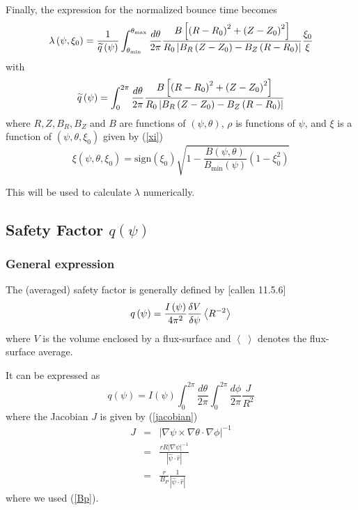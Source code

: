 \documentclass{article}
\begin{document}
Finally, the expression for the normalized bounce time becomes 
\begin{equation}
\lambda \left( \psi ,\xi _{0}\right) =\frac{1}{\widetilde{q}\left( \psi
\right) }\int_{\theta _{\min }}^{\theta _{\max }}\frac{d\theta }{2\pi }\frac{%
B\left[ \left( R-R_{0}\right) ^{2}+\left( Z-Z_{0}\right) ^{2}\right] }{%
R_{0}\left| B_{R}\left( Z-Z_{0}\right) -B_{Z}\left( R-R_{0}\right) \right| }%
\frac{\xi _{0}}{\xi }  \label{lambda1}
\end{equation}
with
\begin{equation}
\widetilde{q}\left( \psi \right) =\int_{0}^{2\pi }\frac{d\theta }{2\pi }%
\frac{B\left[ \left( R-R_{0}\right) ^{2}+\left( Z-Z_{0}\right) ^{2}\right] }{%
R_{0}\left| B_{R}\left( Z-Z_{0}\right) -B_{Z}\left( R-R_{0}\right) \right| }
\end{equation}
where $R,Z,B_{R},B_{Z}$ and $B$ are functions of $\left( \psi ,\theta
\right) $, $\rho $ is functions of $\psi $, and $\xi $ is a function of $%
\left( \psi ,\theta ,\xi _{0}\right) $ given by (\ref{xi}) 
\[
\xi \left( \psi ,\theta ,\xi _{0}\right) =\text{sign}\left( \xi _{0}\right) 
\sqrt{1-\frac{B\left( \psi ,\theta \right) }{B_{\min }\left( \psi \right) }%
\left( 1-\xi _{0}^{2}\right) }
\]

This will be used to calculate $\lambda $ numerically.

\subsection{Safety Factor $q\left( \psi \right) $}

\subsubsection{General expression}

The (averaged) safety factor is generally defined by [callen 11.5.6]
\begin{equation}
q\left( \psi \right) =\frac{I\left( \psi \right) }{4\pi ^{2}}\frac{\delta V}{%
\delta \psi }\left\langle R^{-2}\right\rangle 
\end{equation}
where $V$ is the volume enclosed by a flux-surface and $\left\langle
\;\right\rangle $ denotes the flux-surface average. 

It can be expressed as
\begin{equation}
q\left( \psi \right) =I\left( \psi \right) \int_{0}^{2\pi }\frac{d\theta }{2%
\pi }\int_{0}^{2\pi }\frac{d\phi }{2\pi }\frac{J}{R^{2}}
\end{equation}
where the Jacobian $J$ is given by (\ref{jacobian})
\begin{eqnarray}
J &=&\left| \nabla \psi \times \nabla \theta \cdot \nabla \phi \right| ^{-1}
\\
&=&\frac{rR\left| \nabla \psi \right| ^{-1}}{\left| \widehat{\psi }\cdot 
\widehat{r}\right| } \\
&=&\frac{r}{B_{P}}\frac{1}{\left| \widehat{\psi }\cdot \widehat{r}\right| }
\end{eqnarray}
where we used (\ref{Bp}). 
\end{document}
